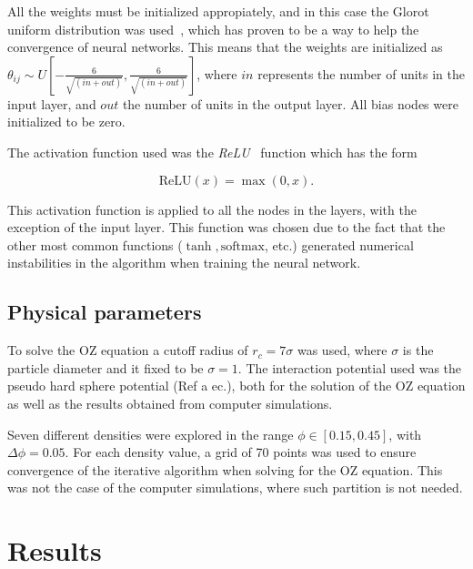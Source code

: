 All the weights must be initialized appropiately, and in this case the Glorot uniform
distribution was used~\cite{glorotUnderstandingDifficultyTraining2010}, which has proven
to be a way to help the convergence of neural networks. This means that the weights
are initialized as $\theta_{ij} \sim U \left[ -\frac{6}{\sqrt{(in + out)}}, \frac{6}{\sqrt{(in + out)}} \right]$,
where $in$ represents the number of units in the input layer, and $out$ the number of
units in the output layer. All bias nodes were initialized to be zero.

The activation function used was the \emph{ReLU}~\cite{glorotDeepSparseRectifier2011}
function which has the form

\begin{equation*}
    \text{ReLU}(x) = \max{(0, x)} .
\end{equation*}

This activation function is applied to all the nodes in the layers, with the exception
of the input layer. This function was chosen due to the fact that the other most common
functions ($\tanh, \text{softmax}$, etc.) generated numerical instabilities in the
algorithm when training the neural network.

\subsection{Physical parameters}

To solve the OZ equation a cutoff radius of $r_c=7\sigma$ was used, where $\sigma$ is the
particle diameter and it fixed to be $\sigma=1$.
The interaction potential used was the pseudo hard sphere potential (Ref a ec.), both
for the solution of the OZ equation as well as the results obtained from computer simulations.

Seven different densities were explored in the range $\phi \in [\num{0.15}, \num{0.45}]$, 
with $\Delta \phi = \num{0.05}$.
For each density value, a grid of 70 points was used to ensure convergence of the iterative
algorithm when solving for the OZ equation. This was not the case of the computer 
simulations, where such partition is not needed.

\section{Results}

